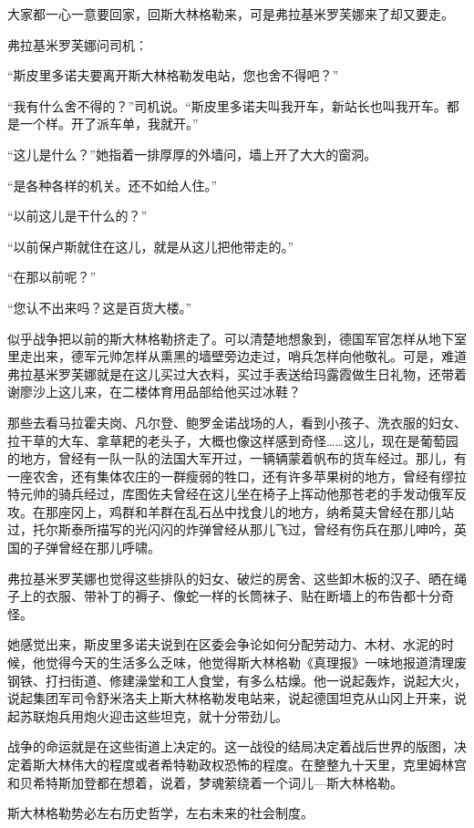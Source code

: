 大家都一心一意要回家，回斯大林格勒来，可是弗拉基米罗芙娜来了却又要走。

弗拉基米罗芙娜问司机：

“斯皮里多诺夫要离开斯大林格勒发电站，您也舍不得吧？”

“我有什么舍不得的？”司机说。“斯皮里多诺夫叫我开车，新站长也叫我开车。都是一个样。开了派车单，我就开。”

“这儿是什么？”她指着一排厚厚的外墙问，墙上开了大大的窗洞。

“是各种各样的机关。还不如给人住。”

“以前这儿是干什么的？”

“以前保卢斯就住在这儿，就是从这儿把他带走的。”

“在那以前呢？”

“您认不出来吗？这是百货大楼。”

似乎战争把以前的斯大林格勒挤走了。可以清楚地想象到，德国军官怎样从地下室里走出来，德军元帅怎样从熏黑的墙壁旁边走过，哨兵怎样向他敬礼。可是，难道弗拉基米罗芙娜就是在这儿买过大衣料，买过手表送给玛露霞做生日礼物，还带着谢廖沙上这儿来，在二楼体育用品部给他买过冰鞋？

那些去看马拉霍夫岗、凡尔登、鲍罗金诺战场的人，看到小孩子、洗衣服的妇女、拉干草的大车、拿草耙的老头子，大概也像这样感到奇怪……这儿，现在是葡萄园的地方，曾经有一队一队的法国大军开过，一辆辆蒙着帆布的货车经过。那儿，有一座农舍，还有集体农庄的一群瘦弱的牲口，还有许多苹果树的地方，曾经有缪拉特元帅的骑兵经过，库图佐夫曾经在这儿坐在椅子上挥动他那苍老的手发动俄军反攻。在那座冈上，鸡群和羊群在乱石丛中找食儿的地方，纳希莫夫曾经在那儿站过，托尔斯泰所描写的光闪闪的炸弹曾经从那儿飞过，曾经有伤兵在那儿呻吟，英国的子弹曾经在那儿呼啸。

弗拉基米罗芙娜也觉得这些排队的妇女、破烂的房舍、这些卸木板的汉子、晒在绳子上的衣服、带补丁的褥子、像蛇一样的长筒袜子、贴在断墙上的布告都十分奇怪。

她感觉出来，斯皮里多诺夫说到在区委会争论如何分配劳动力、木材、水泥的时候，他觉得今天的生活多么乏味，他觉得斯大林格勒《真理报》一味地报道清理废钢铁、打扫街道、修建澡堂和工人食堂，有多么枯燥。他一说起轰炸，说起大火，说起集团军司令舒米洛夫上斯大林格勒发电站来，说起德国坦克从山冈上开来，说起苏联炮兵用炮火迎击这些坦克，就十分带劲儿。

战争的命运就是在这些街道上决定的。这一战役的结局决定着战后世界的版图，决定着斯大林伟大的程度或者希特勒政权恐怖的程度。在整整九十天里，克里姆林宫和贝希特斯加登都在想着，说着，梦魂萦绕着一个词儿—斯大林格勒。

斯大林格勒势必左右历史哲学，左右未来的社会制度。

